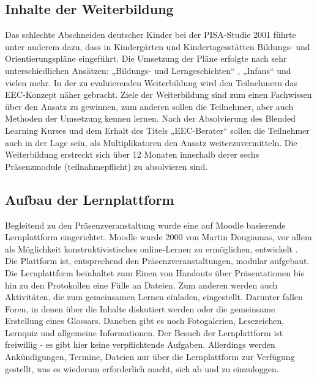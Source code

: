 \documentclass[12pt, bibliography=totoc]{scrartcl}
\begin{document}
\subsection{Inhalte der Weiterbildung}\label{inhalte-der-weiterbildung}

Das schlechte Abschneiden deutscher Kinder bei der PISA-Studie 2001
führte unter anderem dazu, dass in Kindergärten und Kindertagesstätten
Bildungs- und Orientierungspläne eingeführt. Die Umsetzung der Pläne
erfolgte nach sehr unterschiedlichen Ansätzen: „Bildungs- und
Lerngeschichten`` \parencite{leu2007bildungs}, „Infans``
\parencite{laewen2011infans} und vielen mehr. In der zu evaluierenden
Weiterbildung wird den Teilnehmern das EEC-Konzept
\parencite{hebenstreit2007early} näher gebracht. Ziele der Weiterbildung
sind zum einen Fachwissen über den Ansatz zu gewinnen, zum anderen
sollen die Teilnehmer, aber auch Methoden der Umsetzung kennen lernen.
Nach der Absolvierung des Blended Learning Kurses und dem Erhalt des
Titels „EEC-Berater`` sollen die Teilnehmer auch in der Lage sein, als
Multiplikatoren den Ansatz weiterzuvermitteln. Die Weiterbildung
erstreckt sich über 12 Monaten innerhalb derer sechs Präsenzmodule
(teilnahmepflicht) zu absolvieren sind.

\subsection{Aufbau der Lernplattform}\label{aufbau-der-lernplattform}

Begleitend zu den Präsenzveranstaltung wurde eine auf Moodle basierende
Lernplattform eingerichtet. Moodle wurde 2000 von Martin Dougiamas, vor
allem als Möglichkeit konstruktivistisches online-Lernen zu ermöglichen,
entwickelt \parencite{dougiamas2002interpretive}. Die Plattform ist,
entsprechend den Präsenzveranstaltungen, modular aufgebaut. Die
Lernplattform beinhaltet zum Einen von Handouts über Präsentationen bis
hin zu den Protokollen eine Fülle an Dateien. Zum anderen werden auch
Aktivitäten, die zum gemeinsamen Lernen einladen, eingestellt. Darunter
fallen Foren, in denen über die Inhalte diskutiert werden oder die
gemeinsame Erstellung eines Glossars. Daneben gibt es noch Fotogalerien,
Lesezeichen, Lernquiz und allgemeine Informationen. Der Besuch der
Lernplattform ist freiwillig - es gibt hier keine verpflichtende
Aufgaben. Allerdings werden Ankündigungen, Termine, Dateien nur über die
Lernplattform zur Verfügung gestellt, was es wiederum erforderlich
macht, sich ab und zu einzuloggen.
\end{document}
